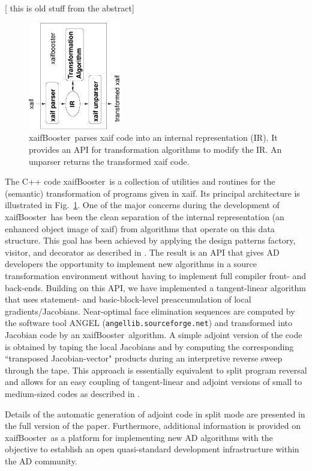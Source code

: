 \documentclass[11pt]{article}
\newcommand{\xaifBooster}{xaifBooster}
\newcommand{\code}[1]{{\small\tt{#1}}}
\newcommand{\reffig}[1]{{Fig.~\ref{#1}}}
\begin{document}
{\color{blue} [ this is old stuff from the abstract]  
  \begin{figure}
    \centering \includegraphics[width=4cm]{principle}
    \caption{\xaifBooster\ parses xaif code into an internal representation (IR).
      It provides an API for transformation algorithms to modify the IR. An unparser
      returns the transformed xaif code.} \label{fig:xaifBooster}
  \end{figure}
  The C++ code \xaifBooster\ is a collection of utilities and routines for the
  (semantic) transformation of programs given in xaif. Its principal architecture 
  is illustrated in \reffig{fig:xaifBooster}. One of the major concerns during
  the development of \xaifBooster\ has been the clean separation of the internal
  representation (an enhanced object image of xaif) from algorithms that operate 
  on this data structure. This goal has been achieved by applying the design 
  patterns \cite{DesignPatterns} factory, visitor, and decorator as described in \cite{UtNa03}.
  The result is an API that gives AD developers the opportunity
  to implement new algorithms in a source transformation environment without
  having to implement full compiler front- and back-ends. Building on
  this API, we have implemented a tangent-linear algorithm that uses statement-
  \cite{SEUpreacc} and basic-block-level preaccumulation of local 
  gradients/Jacobians. Near-optimal face elimination \cite{ElimTechMP} sequences 
  are computed by the software tool 
  ANGEL \cite{AGN03,SAGA} (\code{angellib.sourceforge.net}) and transformed into 
  Jacobian code by
  an \xaifBooster\ algorithm. A simple adjoint version of the code is obtained
  by taping the local Jacobians 
  and by computing the corresponding ``transposed Jacobian-vector" products 
  during an interpretive reverse sweep through the tape. This approach is
  essentially equivalent to split program reversal \cite{Gri00} and allows
  for an easy coupling of tangent-linear and adjoint versions of small to 
  medium-sized codes as described in \cite{NaHe03}. 

  Details of the automatic generation of adjoint code in split mode are presented
  in the full version of the paper. Furthermore, additional information is 
  provided on \xaifBooster\ as a platform for implementing new AD algorithms with 
  the objective to establish an open quasi-standard development infrastructure
  within the AD community.
}
\end{document}

